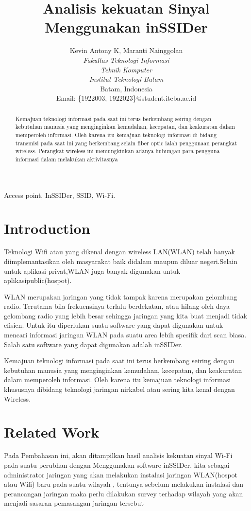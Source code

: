 \documentclass[conference]{IEEEtran}
\title{Analisis kekuatan Sinyal Menggunakan inSSIDer}
\author{Kevin Antony K\IEEEauthorrefmark{1}, Maranti Nainggolan\IEEEauthorrefmark{2}\\
\textit{Fakultas Teknologi Informasi}\\
\textit{Teknik Komputer}\\
\textit{Institut Teknologi Batam}\\
Batam, Indonesia\\
Email: \{\IEEEauthorrefmark{1}1922003, \IEEEauthorrefmark{2}1922023\}@student.iteba.ac.id}
\begin{document}
\maketitle

\begin{abstract}
    
Kemajuan teknologi informasi pada saat ini
terus berkembang seiring dengan kebutuhan manusia yang
menginginkan kemudahan, kecepatan, dan keakuratan dalam
memperoleh informasi. Oleh karena itu kemajuan teknologi
informasi di bidang transmisi pada saat ini yang berkembang
selain fiber optic ialah penggunaan perangkat wireless. Perangkat
wireless ini memungkinkan adanya hubungan para pengguna
informasi dalam melakukan aktivitasnya
\end{abstract}

\begin{IEEEkeywords}
Access point, InSSIDer, SSID, Wi-Fi.
\end{IEEEkeywords}

\section{Introduction}
Teknologi Wifi atau yang dikenal dengan wireless LAN(WLAN) telah banyak diimplemantasikan 
oleh masyarakat baik didalam maupun diluar negeri.Selain untuk aplikasi privat,WLAN 
juga banyak digunakan untuk aplikasipublic(hospot).\

\vspace{0.2cm}

WLAN merupakan jaringan yang tidak tampak karena
merupakan gelombang radio. Terutama bila frekuensinya terlalu
berdekatan, atau hilang oleh daya gelombang radio yang
lebih besar sehingga jaringan yang kita buat menjadi tidak
efisien. Untuk itu diperlukan suatu software yang dapat digunakan
untuk mencari informasi jaringan WLAN pada suatu
area lebih spesifik dari scan biasa. Salah satu software yang
dapat digunakan adalah inSSIDer.

Kemajuan teknologi informasi pada saat ini terus berkembang seiring dengan kebutuhan manusia yang menginginkan kemudahan, kecepatan, dan keakuratan dalam memperoleh informasi. 
Oleh karena itu kemajuan teknologi informasi khususnya dibidang teknologi jaringan nirkabel atau sering kita kenal dengan Wireless.

\section{Related Work}
Pada Pembahasan ini, akan ditampilkan hasil analisis kekuatan sinyal Wi-Fi pada suatu perubhan dengan Menggunakan
software inSSIDer. kita sebagai administrator jaringan yang akan melakukan instalasi jaringan WLAN(hospot atau Wifi)
baru pada suatu wilayah , tentunya sebelum melakukan instalasi dan perancangan jaringan maka perlu
dilakukan survey terhadap wilayah yang akan menjadi sasaran pemasangan jaringan tersebut
\end{document}
